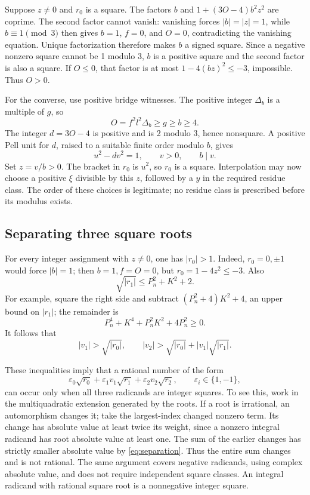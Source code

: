 \documentclass[11pt]{article}
\theoremstyle{definition}
\theoremstyle{remark}
\numberwithin{equation}{section}
\begin{document}
Suppose \(z\ne0\) and \(r_0\) is a square.
The factors \(b\) and \(1+(3O-4)b^2z^2\) are coprime.
The second factor cannot vanish: vanishing forces
\(|b|=|z|=1\), while \(b\equiv1\pmod3\) then gives \(b=1\), \(f=0\),
and \(O=0\), contradicting the vanishing equation.
Unique factorization therefore makes \(b\) a signed square.
Since a negative nonzero square cannot be 1 modulo 3, \(b\) is a
positive square and the second factor is also a square.
If \(O\le0\), that factor is at most
\(1-4(bz)^2\le-3\), impossible. Thus \(O>0\).

For the converse, use positive bridge witnesses.
The positive integer \(\Delta_b\) is a multiple of \(g\), so
\[
 O=f^2l^2\Delta_b\ge g\ge b\ge4.
\]
The integer \(d=3O-4\) is positive and is 2 modulo 3, hence nonsquare.
A positive Pell unit for \(d\), raised to a suitable finite order
modulo \(b\), gives
\[
 u^2-dv^2=1,\qquad v>0,\qquad b\mid v.
\]
Set \(z=v/b>0\). The bracket in \(r_0\) is \(u^2\), so \(r_0\) is a
square. Interpolation may now choose a positive \(\xi\) divisible by
this \(z\), followed by a \(y\) in the required residue class.
The order of these choices is legitimate; no residue class is prescribed
before its modulus exists.

\subsection{Separating three square roots}

For every integer assignment with \(z\ne0\), one has
\(|r_0|>1\). Indeed, \(r_0=0,\pm1\) would force \(|b|=1\);
then \(b=1,f=O=0\), but \(r_0=1-4z^2\le-3\).
Also
\[
 \sqrt{|r_1|}\le P_n^2+K^2+2.
\]
For example, square the right side and subtract
\((P_n^2+4)K^2+4\), an upper bound on \(|r_1|\); the remainder is
\[
 P_n^4+K^4+P_n^2K^2+4P_n^2\ge0.
\]
It follows that
\begin{equation}\label{eq:separation}
 |v_1|>\sqrt{|r_0|},\qquad
 |v_2|>\sqrt{|r_0|}+|v_1|\sqrt{|r_1|}.
\end{equation}

These inequalities imply that a rational number of the form
\[
 \varepsilon_0\sqrt{r_0}+
 \varepsilon_1v_1\sqrt{r_1}+
 \varepsilon_2v_2\sqrt{r_2},
 \qquad \varepsilon_i\in\{1,-1\},
\]
can occur only when all three radicands are integer squares.
To see this, work in the multiquadratic extension generated by the roots.
If a root is irrational, an automorphism changes it; take the
largest-index changed nonzero term. Its change has absolute value at
least twice its weight, since a nonzero integral radicand has root
absolute value at least one. The sum of the earlier changes has
strictly smaller absolute value by \eqref{eq:separation}.
Thus the entire sum changes and is not rational.
The same argument covers negative radicands, using complex absolute
value, and does not require independent square classes.
An integral radicand with rational square root is a nonnegative
integer square.
\end{document}
